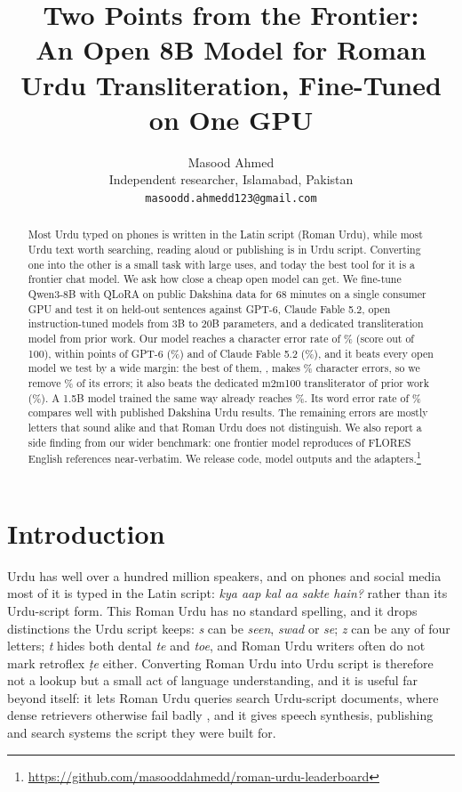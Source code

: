 \documentclass[11pt]{article}
\title{Two Points from the Frontier:\\An Open 8B Model for Roman Urdu Transliteration, Fine-Tuned on One GPU}
\author{Masood Ahmed \\
  Independent researcher, Islamabad, Pakistan \\
  \texttt{masoodd.ahmedd123@gmail.com}}
\begin{document}
\maketitle

\begin{abstract}
Most Urdu typed on phones is written in the Latin script (Roman Urdu), while most Urdu text worth searching, reading aloud or publishing is in Urdu script. Converting one into the other is a small task with large uses, and today the best tool for it is a frontier chat model. We ask how close a cheap open model can get. We fine-tune Qwen3-8B with QLoRA on public Dakshina data for 68 minutes on a single consumer GPU and test it on \NTest held-out sentences against GPT-6, Claude Fable 5.2, open instruction-tuned models from 3B to 20B parameters, and a dedicated transliteration model from prior work. Our model reaches a character error rate of \OursCER\% (score \OursScore out of 100), within \GapGpt points of GPT-6 (\GptCER\%) and \GapFront of Claude Fable 5.2 (\FableCER\%), and it beats every open model we test by a wide margin: the best of them, \BestOpenName, makes \BestOpenCER\% character errors, so we remove \ErrCut\% of its errors; it also beats the dedicated m2m100 transliterator of prior work (\MtwoMCER\%). A 1.5B model trained the same way already reaches \SmallCER\%. Its word error rate of \OursWER\% compares well with published Dakshina Urdu results. The remaining errors are mostly letters that sound alike and that Roman Urdu does not distinguish. We also report a side finding from our wider benchmark: one frontier model reproduces \ContFableNinety of \ContNTr FLORES English references near-verbatim. We release code, model outputs and the adapters.\footnote{\url{https://github.com/masooddahmedd/roman-urdu-leaderboard}}
\end{abstract}

\section{Introduction}

Urdu has well over a hundred million speakers, and on phones and social media most of it is typed in the Latin script: \textit{kya aap kal aa sakte hain?} rather than its Urdu-script form. This Roman Urdu has no standard spelling, and it drops distinctions the Urdu script keeps: \textit{s} can be \textit{seen}, \textit{swad} or \textit{se}; \textit{z} can be any of four letters; \textit{t} hides both dental \textit{te} and \textit{toe}, and Roman Urdu writers often do not mark retroflex \textit{\d{t}e} either. Converting Roman Urdu into Urdu script is therefore not a lookup but a small act of language understanding, and it is useful far beyond itself: it lets Roman Urdu queries search Urdu-script documents, where dense retrievers otherwise fail badly \citep{ahmed2026retrieval}, and it gives speech synthesis, publishing and search systems the script they were built for.
\end{document}
